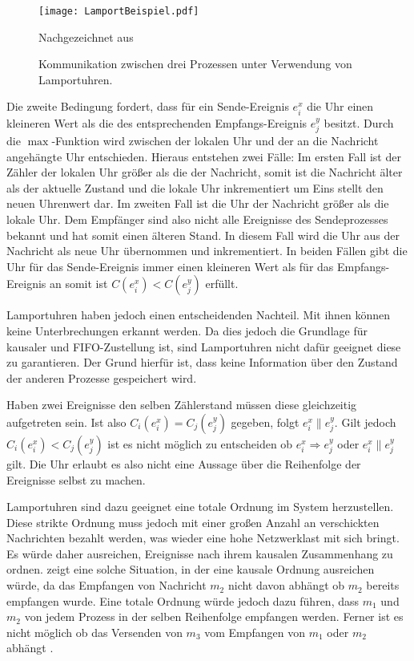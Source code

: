 \begin{figure}[ht]
    \centering
    \texttt{[image: LamportBeispiel.pdf]}
    \caption[Exemplarische Kommunikation mit Lamport Uhr]{Kommunikation zwischen drei Prozessen unter Verwendung von Lamportuhren.}
    Nachgezeichnet aus  \cite{landes2006dynamic}
    \label{fig:lamportBsp}
\end{figure}

Die zweite Bedingung fordert, dass für ein Sende-Ereignis $e_i^x$ die Uhr einen kleineren Wert als die des entsprechenden Empfangs-Ereignis $e_j^y$ besitzt.
Durch die $\max$-Funktion wird zwischen der lokalen Uhr und der an die Nachricht angehängte Uhr entschieden.
Hieraus entstehen zwei Fälle:
Im ersten Fall ist der Zähler der lokalen Uhr größer als die der Nachricht, somit ist die Nachricht älter als der aktuelle Zustand und die lokale Uhr inkrementiert um Eins stellt den neuen Uhrenwert dar.
Im zweiten Fall ist die Uhr der Nachricht größer als die lokale Uhr.
Dem Empfänger sind also nicht alle Ereignisse des Sendeprozesses bekannt und hat somit einen älteren Stand.
In diesem Fall wird die Uhr aus der Nachricht als neue Uhr übernommen und inkrementiert.
In beiden Fällen gibt die Uhr für das Sende-Ereignis immer einen kleineren Wert als für das Empfangs-Ereignis an somit ist $C(e_i^x) < C(e_j^y)$ erfüllt.

Lamportuhren haben jedoch einen entscheidenden Nachteil.
Mit ihnen können keine Unterbrechungen erkannt werden.
Da dies jedoch die Grundlage für kausaler und FIFO-Zustellung ist, sind Lamportuhren nicht dafür geeignet diese zu garantieren.
Der Grund hierfür ist, dass keine Information über den Zustand der anderen Prozesse gespeichert wird.

Haben zwei Ereignisse den selben Zählerstand müssen diese gleichzeitig aufgetreten sein.
Ist also $C_i(e_i^x)=C_j(e_j^y)$ gegeben, folgt $e_i^x \parallel e_j^y$.
Gilt jedoch $C_i(e_i^x)<C_j(e_j^y)$ ist es nicht möglich zu entscheiden ob $e_i^x \Rightarrow e_j^y$ oder $e_i^x \parallel e_j^y$ gilt.
Die Uhr erlaubt es also nicht eine Aussage über die Reihenfolge der Ereignisse selbst zu machen.

Lamportuhren sind dazu geeignet eine totale Ordnung im System herzustellen.
Diese strikte Ordnung muss jedoch mit einer großen Anzahl an verschickten Nachrichten bezahlt werden, was wieder eine hohe Netzwerklast mit sich bringt.
Es würde daher ausreichen, Ereignisse nach ihrem kausalen Zusammenhang zu ordnen.
 zeigt eine solche Situation, in der eine kausale Ordnung ausreichen würde, da das Empfangen von Nachricht $m_2$ nicht davon abhängt ob $m_2$ bereits empfangen wurde.
Eine totale Ordnung würde jedoch dazu führen, dass $m_1$ und $m_2$ von jedem Prozess in der selben Reihenfolge empfangen werden.
Ferner ist es nicht möglich ob das Versenden von $m_3$ vom Empfangen von $m_1$ oder $m_2$ abhängt \cite{Tanenbaum2007}.

